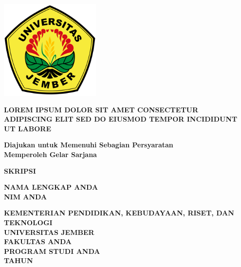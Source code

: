 \documentclass[12pt, a4paper, onecolumn, oneside]{report}
\newcommand{\judul}{LOREM IPSUM DOLOR SIT AMET CONSECTETUR ADIPISCING ELIT SED DO EIUSMOD TEMPOR INCIDIDUNT UT LABORE}
\newcommand{\maksud}{Diajukan untuk Memenuhi Sebagian Persyaratan\\Memperoleh Gelar Sarjana}
\newcommand{\jeniskarya}{SKRIPSI}
\newcommand{\nama}{NAMA LENGKAP ANDA}
\newcommand{\nim}{NIM ANDA}
\newcommand{\prodi}{PROGRAM STUDI ANDA}
\newcommand{\fakultas}{FAKULTAS ANDA}
\newcommand{\tahunterbit}{TAHUN}
\begin{document}
\begin{titlepage}
    \centering
    \vspace*{1cm}
    
    \includegraphics[width=5cm]{resources/images/logo_unej.png}\par
    \vspace{1cm}
    
    \textbf{\Large \judul} \par
    \vspace{1.5cm}
    
    \textbf{\maksud} \par
    \vspace{1cm}
    
    \textbf{\jeniskarya} \par
    \vspace{1.5cm}
    
    \textbf{\nama} \\
    \textbf{\nim} \par
    \vspace{1.5cm}
    
    \textbf{KEMENTERIAN PENDIDIKAN, KEBUDAYAAN, RISET, DAN TEKNOLOGI} \\
    \textbf{UNIVERSITAS JEMBER} \\
    \textbf{\fakultas} \\
    \textbf{\prodi} \\
    \textbf{\tahunterbit}
\end{titlepage}
\end{document}
